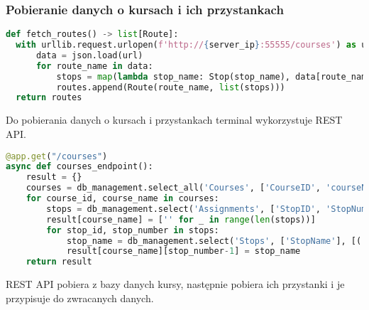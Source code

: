 \subsubsection{Pobieranie danych o kursach i ich przystankach}
\begin{lstlisting}[language={Python}, caption={Terminal, Lokalizacja: \texttt{client/client.py}}]
def fetch_routes() -> list[Route]:
  with urllib.request.urlopen(f'http://{server_ip}:55555/courses') as url:
      data = json.load(url)
      for route_name in data:
          stops = map(lambda stop_name: Stop(stop_name), data[route_name])
          routes.append(Route(route_name, list(stops)))
  return routes
\end{lstlisting}
Do pobierania danych o kursach i przystankach terminal wykorzystuje REST API.
\pagebreak
\begin{lstlisting}[language={Python}, caption={REST API, Lokalizacja: \texttt{backend/server.py}}]
@app.get("/courses")
async def courses_endpoint():
    result = {}
    courses = db_management.select_all('Courses', ['CourseID', 'courseName'])
    for course_id, course_name in courses:
        stops = db_management.select('Assignments', ['StopID', 'StopNumber'], [('CourseID', course_id)])
        result[course_name] = ['' for _ in range(len(stops))]
        for stop_id, stop_number in stops:
            stop_name = db_management.select('Stops', ['StopName'], [('StopID', stop_id)])[0][0]
            result[course_name][stop_number-1] = stop_name
    return result
\end{lstlisting}
REST API pobiera z bazy danych kursy, następnie pobiera ich przystanki i je przypisuje do zwracanych danych.
